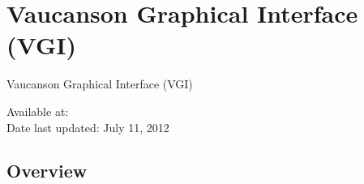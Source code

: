 

\setlength{\parskip}{0.1in} \setlength{\parindent}{0in}

\newcommand{\exercise}[2]{{\bf Exercise #1.} #2}
\newcommand\xmatch{\mathop{{\bf match}}}
\newcommand\xwith{\mathrel{{\bf with}}}
\newcommand\xif{\mathop{{\bf if}}}
\newcommand\xthen{\mathrel{{\bf then}}}
\newcommand\xelse{\mathrel{{\bf else}}}
\newcommand\xlet{\mathop{{\bf let}}}
\newcommand\xrec{\mathrel{{\bf rec}}}
\newcommand\Unit{{\it Unit}}
\newcommand\Void{{\it Void}}
\newcommand\xext{\quad\mathop{\hbox{{\it ext}}}}
\newcommand\nat{{\mathbb N}}


\newcommand\mb[1]{{\bf #1}}
\newcommand\ms[1]{{\it #1}}


% 



\chapter{Vaucanson Graphical Interface (VGI)}
\label{chp:vgi}
Vaucanson Graphical Interface (VGI)

\noindent
Available at:   \\
Date last updated:
July 11, 2012


\section{Overview}



